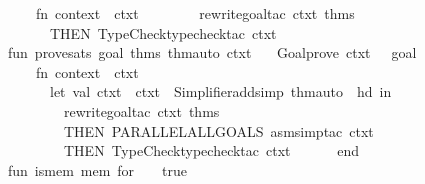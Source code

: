 \begin{isabellebody}
\ \ \ \ {\isacharparenleft}{\kern0pt}fn\ {\isacharbraceleft}{\kern0pt}context\ {\isacharequal}{\kern0pt}\ ctxt{\isacharprime}{\kern0pt}{\isacharcomma}{\kern0pt}\ {\isachardot}{\kern0pt}{\isachardot}{\kern0pt}{\isachardot}{\kern0pt}{\isacharbraceright}{\kern0pt}\ {\isacharequal}{\kern0pt}{\isachargreater}{\kern0pt}\isanewline
\ \ \ \ \ \ rewrite{\isacharunderscore}{\kern0pt}goal{\isacharunderscore}{\kern0pt}tac\ ctxt{\isacharprime}{\kern0pt}\ thms\ {}\isanewline
\ \ \ \ \ \ THEN\ TypeCheck{\isachardot}{\kern0pt}typecheck{\isacharunderscore}{\kern0pt}tac\ ctxt{\isacharprime}{\kern0pt}{\isacharparenright}{\kern0pt}\isanewline
\isanewline
fun\ prove{\isacharunderscore}{\kern0pt}sats\ goal\ thms\ thm{\isacharunderscore}{\kern0pt}auto\ ctxt\ {\isacharequal}{\kern0pt}\isanewline
\ \ Goal{\isachardot}{\kern0pt}prove\ ctxt\ {\isacharbrackleft}{\kern0pt}{\isacharbrackright}{\kern0pt}\ {\isacharbrackleft}{\kern0pt}{\isacharbrackright}{\kern0pt}\ goal\isanewline
\ \ \ \ {\isacharparenleft}{\kern0pt}fn\ {\isacharbraceleft}{\kern0pt}context\ {\isacharequal}{\kern0pt}\ ctxt{\isacharprime}{\kern0pt}{\isacharcomma}{\kern0pt}\ {\isachardot}{\kern0pt}{\isachardot}{\kern0pt}{\isachardot}{\kern0pt}{\isacharbraceright}{\kern0pt}\ {\isacharequal}{\kern0pt}{\isachargreater}{\kern0pt}\isanewline
\ \ \ \ \ \ let\ val\ ctxt{\isacharprime}{\kern0pt}{\isacharprime}{\kern0pt}\ {\isacharequal}{\kern0pt}\ ctxt{\isacharprime}{\kern0pt}\ {\isacharbar}{\kern0pt}{\isachargreater}{\kern0pt}\ Simplifier{\isachardot}{\kern0pt}add{\isacharunderscore}{\kern0pt}simp\ {\isacharparenleft}{\kern0pt}thm{\isacharunderscore}{\kern0pt}auto\ {\isacharbar}{\kern0pt}{\isachargreater}{\kern0pt}\ hd{\isacharparenright}{\kern0pt}\ in\isanewline
\ \ \ \ \ \ \ \ rewrite{\isacharunderscore}{\kern0pt}goal{\isacharunderscore}{\kern0pt}tac\ ctxt{\isacharprime}{\kern0pt}{\isacharprime}{\kern0pt}\ thms\ {}\isanewline
\ \ \ \ \ \ \ \ THEN\ PARALLEL{\isacharunderscore}{\kern0pt}ALLGOALS\ {\isacharparenleft}{\kern0pt}asm{\isacharunderscore}{\kern0pt}simp{\isacharunderscore}{\kern0pt}tac\ ctxt{\isacharprime}{\kern0pt}{\isacharprime}{\kern0pt}{\isacharparenright}{\kern0pt}\isanewline
\ \ \ \ \ \ \ \ THEN\ TypeCheck{\isachardot}{\kern0pt}typecheck{\isacharunderscore}{\kern0pt}tac\ ctxt{\isacharprime}{\kern0pt}{\isacharprime}{\kern0pt}\isanewline
\ \ \ \ \ \ end{\isacharparenright}{\kern0pt}\isanewline
\isanewline
fun\ is{\isacharunderscore}{\kern0pt}mem\ \isactrlConstUNDERSCORE {\isasymopen}mem\ for\ {\isacharunderscore}{\kern0pt}\ {\isacharunderscore}{\kern0pt}{\isasymclose}\ {\isacharequal}{\kern0pt}\ true\isanewline

\end{isabellebody}
